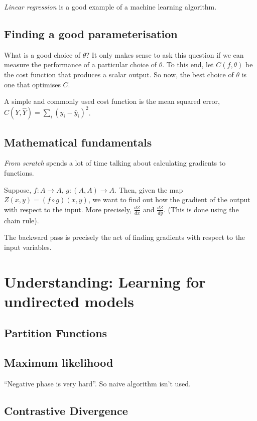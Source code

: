 \documentclass[11pt]{article}
\begin{document}
\emph{Linear regression} is a good example of a machine learning algorithm.

\subsection{Finding a good parameterisation}
\label{sec:org86acd44}
What is a good choice of \(\theta\)? It only makes sense to ask this question if we can measure the performance of a particular choice of \(\theta\). To this end, let \(C(f, \theta)\) be the cost function that produces a scalar output. So now, the best choice of \(\theta\) is one that optimises \(C\).

A simple and commonly used cost function is the mean squared error, \(C(Y, \hat{Y}) = \sum_i (y_i - \hat{y}_i)^2\).



\subsection{Mathematical fundamentals}
\label{sec:orge866d5a}
\emph{From scratch} spends a lot of time talking about calculating gradients to functions.

Suppose, \(f : A \to A\), \(g : (A, A) \to A\). Then, given the map \(Z(x, y) = (f \circ g) (x, y)\), we want to find out how the gradient of the output with respect to the input. More precisely, \(\frac{dZ}{dx}\) and \(\frac{dZ}{dy}\).
(This is done using the chain rule).

The backward pass is precisely the act of finding gradients with respect to the input variables.




\section{Understanding: Learning for undirected models}
\label{sec:org5adc7a1}
\subsection{Partition Functions}
\label{sec:org188fad7}
\subsection{Maximum likelihood}
\label{sec:orgaa26698}
``Negative phase is very hard''. So naive algorithm isn't used.

\subsection{Contrastive Divergence}
\label{sec:org8c0e176}
\end{document}
